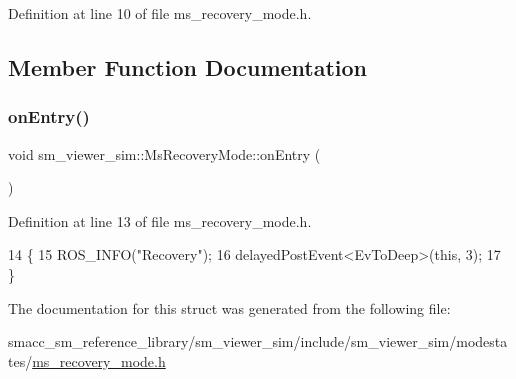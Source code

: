 Definition at line 10 of file ms\+\_\+recovery\+\_\+mode.\+h.



\subsection{Member Function Documentation}
\mbox{\label{structsm__viewer__sim_1_1MsRecoveryMode_ab436ff9e90b963a3339644c0baf223d7}} 
\subsubsection{\texorpdfstring{on\+Entry()}{onEntry()}}
{\footnotesize\ttfamily void sm\+\_\+viewer\+\_\+sim\+::\+Ms\+Recovery\+Mode\+::on\+Entry (\begin{DoxyParamCaption}{ }\end{DoxyParamCaption})\hspace{0.3cm}{\ttfamily [inline]}}



Definition at line 13 of file ms\+\_\+recovery\+\_\+mode.\+h.


\begin{DoxyCode}
14     \{
15         ROS\_INFO(\textcolor{stringliteral}{"Recovery"});
16         delayedPostEvent<EvToDeep>(\textcolor{keyword}{this}, 3);
17     \}
\end{DoxyCode}


The documentation for this struct was generated from the following file\+:\begin{DoxyCompactItemize}
\item 
smacc\+\_\+sm\+\_\+reference\+\_\+library/sm\+\_\+viewer\+\_\+sim/include/sm\+\_\+viewer\+\_\+sim/modestates/\hyperlink{ms__recovery__mode_8h}{ms\+\_\+recovery\+\_\+mode.\+h}\end{DoxyCompactItemize}
